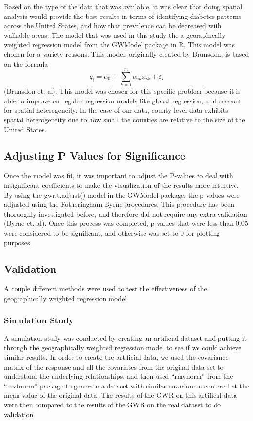 \documentclass[
]{article}
\begin{document}
Based on the type of the data that was available, it was clear that
doing spatial analysis would provide the best results in terms of
identifying diabetes patterns across the United States, and how that
prevalence can be decreased with walkable areas. The model that was used
in this study the a georaphically weighted regression model from the
GWModel package in R. This model was chonen for a variety reasons. This
model, originally created by Brunsdon, is based on the formula
\[y_i = \alpha_{0} + \sum_{k=1}^{m} \alpha_{ik}x_{ik} + \varepsilon_{i}\]
(Brunsdon et. al). This model was chosen for this specific problem
because it is able to improve on regular regression models like global
regression, and account for spatial heterogeneity. In the case of our
data, county level data exhibits spatial heterogeneity due to how small
the counties are relative to the size of the United States.

\subsection{Adjusting P Values for
Significance}\label{adjusting-p-values-for-significance}

Once the model was fit, it was important to adjust the P-values to deal
with insignificant coefficients to make the visualization of the results
more intuitive. By using the gwr.t.adjust() model in the GWModel
package, the p-values were adjusted using the Fotheringham-Byrne
procedures. This procedure has been thoruoghly investigated before, and
therefore did not require any extra validation (Byrne et. al). Once this
process was completed, p-values that were less than 0.05 were considered
to be significant, and otherwise was set to 0 for plotting purposes.

\subsection{Validation}\label{validation}

A couple different methods were used to test the effectiveness of the
geographically weighted regression model

\subsubsection{Simulation Study}\label{simulation-study}

A simulation study was conducted by creating an artificial dataset and
putting it through the geographically weighted regression model to see
if we could achieve similar results. In order to create the artificial
data, we used the covariance matrix of the response and all the
covariates from the original data set to understand the underlying
relationships, and then used ``rmvnorm'' from the ``mvtnorm'' package to
generate a dataset with similar covariances centered at the mean value
of the original data. The results of the GWR on this artifical data were
then compared to the results of the GWR on the real dataset to do
validation
\end{document}
